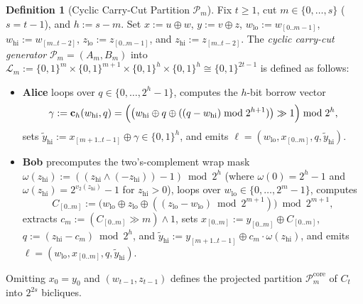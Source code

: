 \documentclass[11pt,reqno]{amsart}
\theoremstyle{definition}
\newtheorem{definition}[theorem]{Definition}
\theoremstyle{remark}
\newcommand{\bv}{\mathbf{c}}
\numberwithin{equation}{section}
\begin{document}
\begin{definition}[Cyclic Carry-Cut Partition $\mathcal{P}_m$]
  \label{def:cyclic-cut}
  Fix $t \ge 1$, cut $m \in \{0, \dots, s\}$ ($s = t - 1$), and $h := s - m$. Set $x := u \oplus w$, $y := v \oplus z$, $w_{\mathrm{lo}} := w_{[0..m-1]}$, $w_{\mathrm{hi}} := w_{[m..t-2]}$, $z_{\mathrm{lo}} := z_{[0..m-1]}$, and $z_{\mathrm{hi}} := z_{[m..t-2]}$. The \emph{cyclic carry-cut generator} $\mathcal{P}_m = (A_m, B_m)$ into $\mathcal{L}_m := \{0, 1\}^m \times \{0, 1\}^{m+1} \times \{0, 1\}^h \times \{0, 1\}^h \cong \{0, 1\}^{2t-1}$ is defined as follows:
  \begin{itemize}[leftmargin=2em]
    \item \textbf{Alice} loops over $q \in \{0, \dots, 2^h - 1\}$, computes the $h$-bit borrow vector
    \begin{equation}
      \label{eq:alice-borrow}
      \gamma := \bv_h(w_{\mathrm{hi}}, q) = \Bigl(\bigl(w_{\mathrm{hi}} \oplus q \oplus ((q - w_{\mathrm{hi}}) \bmod 2^{h+1})\bigr) \gg 1\Bigr) \bmod 2^h,
    \end{equation}
    sets $\tilde{y}_{\mathrm{hi}} := x_{[m+1..t-1]} \oplus \gamma \in \{0, 1\}^h$, and emits $\ell = (w_{\mathrm{lo}}, x_{[0..m]}, q, \tilde{y}_{\mathrm{hi}})$.
    \item \textbf{Bob} precomputes the two's-complement wrap mask $\omega(z_{\mathrm{hi}}) := ((z_{\mathrm{hi}} \land (-z_{\mathrm{hi}})) - 1) \bmod 2^h$ (where $\omega(0) = 2^h - 1$ and $\omega(z_{\mathrm{hi}}) = 2^{v_2(z_{\mathrm{hi}})} - 1$ for $z_{\mathrm{hi}} > 0$), loops over $w_{\mathrm{lo}} \in \{0, \dots, 2^m - 1\}$, computes
    \begin{equation}
      \label{eq:bob-borrow}
      C_{[0..m]} := \bigl(w_{\mathrm{lo}} \oplus z_{\mathrm{lo}} \oplus ((z_{\mathrm{lo}} - w_{\mathrm{lo}}) \bmod 2^{m+1})\bigr) \bmod 2^{m+1},
    \end{equation}
    extracts $c_m := (C_{[0..m]} \gg m) \land 1$, sets $x_{[0..m]} := y_{[0..m]} \oplus C_{[0..m]}$, $q := (z_{\mathrm{hi}} - c_m) \bmod 2^h$, and $\tilde{y}_{\mathrm{hi}} := y_{[m+1..t-1]} \oplus c_m \cdot \omega(z_{\mathrm{hi}})$, and emits $\ell = (w_{\mathrm{lo}}, x_{[0..m]}, q, \tilde{y}_{\mathrm{hi}})$.
  \end{itemize}
  Omitting $x_0 = y_0$ and $(w_{t-1}, z_{t-1})$ defines the projected partition $\mathcal{P}_m^{\mathrm{core}}$ of $C_t$ into $2^{2s}$ bicliques.
\end{definition}
\end{document}
